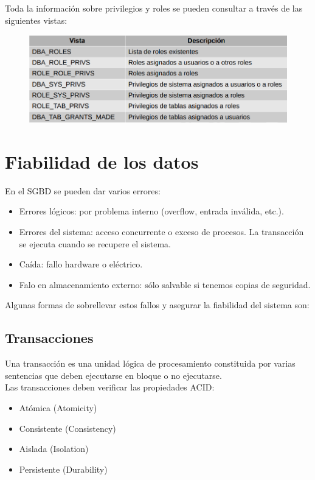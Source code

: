 Toda la información sobre privilegios y roles se pueden consultar a través de las siguientes vistas:

\begin{figure}[H]
  \center
  \includegraphics[scale=0.45]{img/17.png}
\end{figure}

\section{Fiabilidad de los datos}

En el SGBD se pueden dar varios errores:

\begin{itemize}
\item Errores lógicos: por problema interno (overflow, entrada inválida, etc.).
\item Errores del sistema: acceso concurrente o exceso de procesos. La transacción se ejecuta cuando se recupere el sistema.
\item Caída: fallo hardware o eléctrico.
\item Falo en almacenamiento externo: sólo salvable si tenemos copias de seguridad.
\end{itemize}

Algunas formas de sobrellevar estos fallos y asegurar la fiabilidad del sistema son:

\subsection{Transacciones}

Una transacción es una unidad lógica de procesamiento constituida por varias sentencias que deben ejecutarse en bloque o no ejecutarse.\\
Las transacciones deben verificar las propiedades ACID:
\begin{itemize}
\item Atómica (Atomicity)
\item Consistente (Consistency)
\item Aislada (Isolation)
\item Persistente (Durability)
\end{itemize}

